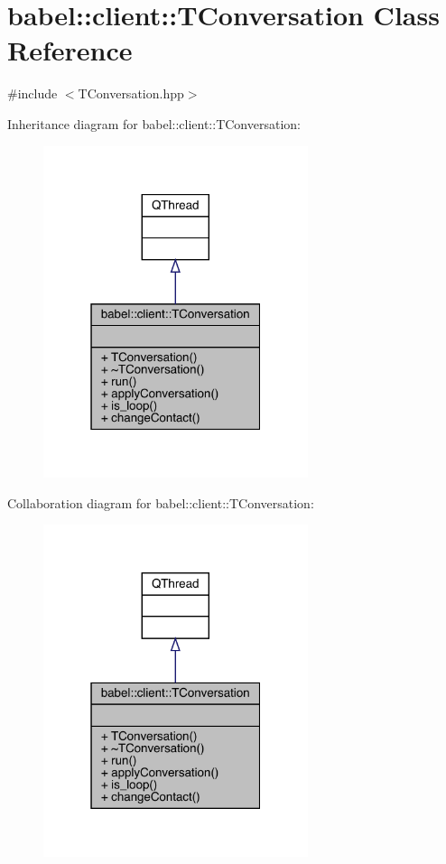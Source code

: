 \hypertarget{classbabel_1_1client_1_1_t_conversation}{}\section{babel\+:\+:client\+:\+:T\+Conversation Class Reference}
\label{classbabel_1_1client_1_1_t_conversation}


{\ttfamily \#include $<$T\+Conversation.\+hpp$>$}



Inheritance diagram for babel\+:\+:client\+:\+:T\+Conversation\+:\nopagebreak
\begin{figure}[H]
\begin{center}
\leavevmode
\includegraphics[width=220pt]{classbabel_1_1client_1_1_t_conversation__inherit__graph}
\end{center}
\end{figure}


Collaboration diagram for babel\+:\+:client\+:\+:T\+Conversation\+:\nopagebreak
\begin{figure}[H]
\begin{center}
\leavevmode
\includegraphics[width=220pt]{classbabel_1_1client_1_1_t_conversation__coll__graph}
\end{center}
\end{figure}
